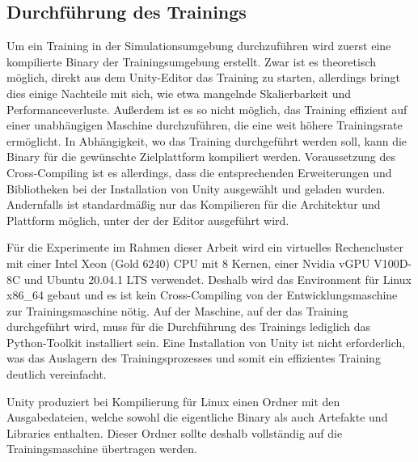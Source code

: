 \subsection{Durchführung des Trainings}
Um ein Training in der Simulationsumgebung durchzuführen wird zuerst eine kompilierte Binary der Trainingsumgebung erstellt.
Zwar ist es theoretisch möglich, direkt aus dem Unity-Editor das Training zu starten, allerdings bringt dies einige Nachteile mit sich, wie etwa mangelnde Skalierbarkeit und Performanceverluste.
Außerdem ist es so nicht möglich, das Training effizient auf einer unabhängigen Maschine durchzuführen, die eine weit höhere Trainingsrate ermöglicht.
In Abhängigkeit, wo das Training durchgeführt werden soll, kann die Binary für die gewünschte Zielplattform kompiliert werden.
Voraussetzung des Cross-Compiling ist es allerdings, dass die entsprechenden Erweiterungen und Bibliotheken bei der Installation von Unity ausgewählt und geladen wurden.
Andernfalls ist standardmäßig nur das Kompilieren für die Architektur und Plattform möglich, unter der der Editor ausgeführt wird.

Für die Experimente im Rahmen dieser Arbeit wird ein virtuelles Rechencluster mit einer Intel Xeon (Gold 6240) CPU mit 8 Kernen, einer Nvidia vGPU V100D-8C und Ubuntu 20.04.1 LTS verwendet.
Deshalb wird das Environment für Linux x86\_64 gebaut und es ist kein Cross-Compiling von der Entwicklungsmaschine zur Trainingsmaschine nötig.
Auf der Maschine, auf der das Training durchgeführt wird, muss für die Durchführung des Trainings lediglich das Python-Toolkit installiert sein.
Eine Installation von Unity ist nicht erforderlich, was das Auslagern des Trainingsprozesses und somit ein effizientes Training deutlich vereinfacht.

Unity produziert bei Kompilierung für Linux einen Ordner mit den Ausgabedateien, welche sowohl die eigentliche Binary als auch Artefakte und Libraries enthalten.
Dieser Ordner sollte deshalb vollständig auf die Trainingsmaschine übertragen werden.

